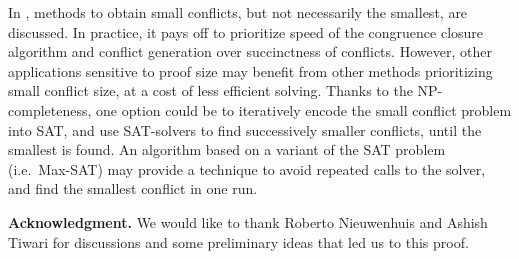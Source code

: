 \documentclass{easychair}
\begin{document}
In \cite{Fontaine1,Nieuwenhuis3,Nieuwenhuis9}, methods to obtain small
conflicts, but not necessarily the smallest, are discussed.  In practice, it
pays off to prioritize speed of the congruence closure algorithm and conflict
generation over succinctness of conflicts.  However, other applications
sensitive to proof size may benefit from other methods prioritizing small
conflict size, at a cost of less efficient solving. Thanks to the
NP-completeness, one option could be to iteratively encode the small conflict
problem into SAT, and use SAT-solvers to find successively smaller conflicts,
until the smallest is found.  An algorithm based on a variant of the SAT problem
(i.e.\ Max-SAT) may provide a technique to avoid repeated calls to the solver,
and find the smallest conflict in one run.

\vspace*{5pt}\noindent
{\bf Acknowledgment.} We would like to thank Roberto Nieuwenhuis and Ashish
Tiwari for discussions and some preliminary ideas that led us to this proof.



\end{document}
